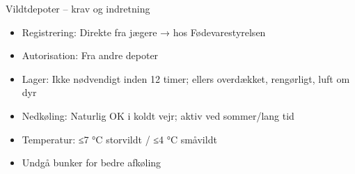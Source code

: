 \begin{frame}{Vildtdepoter – krav og indretning}
    \begin{itemize}
        \item Registrering: Direkte fra jægere → hos Fødevarestyrelsen
        \item Autorisation: Fra andre depoter
        \item Lager: Ikke nødvendigt inden 12 timer; ellers overdækket, rengørligt, luft om dyr
        \item Nedkøling: Naturlig OK i koldt vejr; aktiv ved sommer/lang tid
        \item Temperatur: ≤7 °C storvildt / ≤4 °C småvildt
        \item Undgå bunker for bedre afkøling
    \end{itemize}
\end{frame}